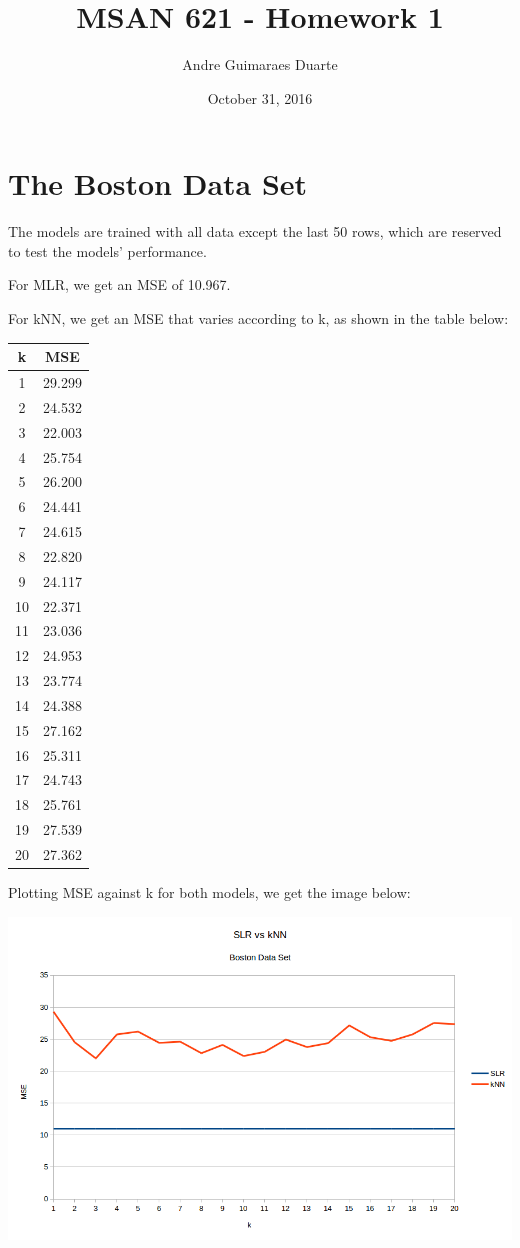 \documentclass[]{article}
\title{MSAN 621 - Homework 1}
\author{Andre Guimaraes Duarte}
\date{October 31, 2016}
\begin{document}
\maketitle

\section{The Boston Data Set}

The models are trained with all data except the last 50 rows, which are reserved to test the models' performance.

For MLR, we get an MSE of 10.967.

For kNN, we get an MSE that varies according to k, as shown in the table below:

\begin{center}
\begin{tabular}{c|c}
k & MSE\\
\hline
1 & 29.299\\
2 & 24.532\\
3 & 22.003\\
4 & 25.754\\
5 & 26.200\\
6 & 24.441\\
7 & 24.615\\
8 & 22.820\\
9 & 24.117\\
10 & 22.371\\
11 & 23.036\\
12 & 24.953\\
13 & 23.774\\
14 & 24.388\\
15 & 27.162\\
16 & 25.311\\
17 & 24.743\\
18 & 25.761\\
19 & 27.539\\
20 & 27.362\\
\end{tabular}
\end{center}

Plotting MSE against k for both models, we get the image below:

\begin{center}
\includegraphics[width=\linewidth]{boston.png}
\end{center}
\end{document}
